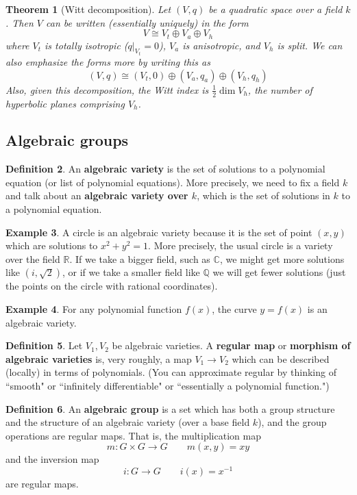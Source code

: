 \documentclass[12pt]{article}
\newtheorem{theorem}{Theorem}
\theoremstyle{definition}
\newtheorem{definition}[theorem]{Definition}
\newtheorem{example}[theorem]{Example}
\numberwithin{theorem}{subsection}
\newcommand{\Q}{\mathbb{Q}}
\newcommand{\R}{\mathbb{R}}
\newcommand{\C}{\mathbb{C}}
\newcommand{\tbf}{\textbf}
\newcommand{\inv}{^{-1}}
\newcommand{\iso}{\cong}
\begin{document}
\begin{theorem}[Witt decomposition]
Let $(V,q)$ be a quadratic space over a field $k$. Then $V$ can be written (essentially uniquely) in the form
\[
	V \iso V_t \oplus V_a \oplus V_h
\]
where $V_t$ is totally isotropic ($q|_{V_t} = 0$), $V_a$ is anisotropic, and $V_h$ is split. We can also emphasize the forms more by writing this as
\[
	(V,q) \iso (V_t, 0) \oplus (V_a, q_a) \oplus (V_h, q_h)
\]
Also, given this decomposition, the Witt index is $\frac 12 \dim V_h$, the number of hyperbolic planes comprising $V_h$.
\end{theorem}

\subsection{Algebraic groups}
\label{alg groups}

\begin{definition}
An \tbf{algebraic variety} is the set of solutions to a polynomial equation (or list of polynomial equations). More precisely, we need to fix a field $k$ and talk about an \tbf{algebraic variety over $k$}, which is the set of solutions in $k$ to a polynomial equation.
\end{definition}

\begin{example}
A circle is an algebraic variety because it is the set of point $(x,y)$ which are solutions to $x^2 + y^2 = 1$. More precisely, the usual circle is a variety over the field $\R$. If we take a bigger field, such as $\C$, we might get more solutions like $(i, \sqrt{2})$, or if we take a smaller field like $\Q$ we will get fewer solutions (just the points on the circle with rational coordinates).
\end{example}

\begin{example}
For any polynomial function $f(x)$, the curve $y = f(x)$ is an algebraic variety.
\end{example}

\begin{definition}
Let $V_1, V_2$ be algebraic varieties. A \tbf{regular map} or \tbf{morphism of algebraic varieties} is, very roughly, a map $V_1 \to V_2$ which can be described (locally) in terms of polynomials. (You can approximate regular by thinking of ``smooth" or ``infinitely differentiable" or ``essentially a polynomial function.")
\end{definition}

\begin{definition}
An \tbf{algebraic group} is a set which has both a group structure and the structure of an algebraic variety (over a base field $k$), and the group operations are regular maps. That is, the multiplication map
\[
	m:G \times G \to G \qquad m(x,y) = xy
\]
and the inversion map
\[
	i:G \to G \qquad i(x) = x \inv
\]
are regular maps.
\end{definition}
\end{document}
